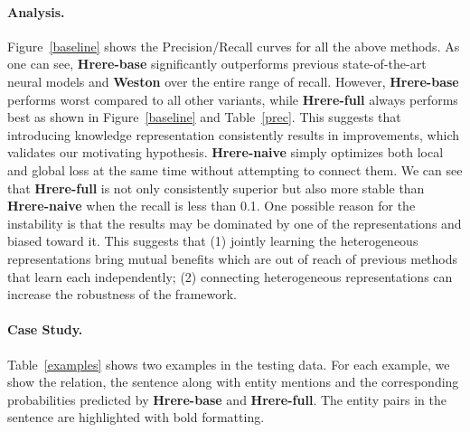 \documentclass[11pt,a4paper]{article}
\def\HRERE{{\sc Hrere}\xspace}
\begin{document}
\paragraph*{Analysis.}
Figure~\ref{baseline} shows the Precision/Recall curves for all the above methods.
As one can see, {\bf \HRERE-base} significantly outperforms previous state-of-the-art neural models and {\bf Weston} over the entire range of recall.
However, {\bf \HRERE-base} performs worst compared to all other variants, while {\bf \HRERE-full} always performs best as shown in Figure~\ref{baseline} and Table~\ref{prec}.
This suggests that introducing knowledge representation consistently results in improvements, which validates our motivating hypothesis.
{\bf \HRERE-naive} simply optimizes both local and global loss at the same time without attempting to connect them.
We can see that {\bf \HRERE-full} is not only consistently superior but also more stable than {\bf \HRERE-naive} when the recall is less than 0.1.
One possible reason for the instability is that the results may be dominated by one of the representations and biased toward it.
This suggests that (1) jointly learning the heterogeneous representations bring mutual benefits which are out of reach of previous methods that learn each independently; (2) connecting heterogeneous representations can increase the robustness of the framework.










\paragraph*{Case Study.}





 Table~\ref{examples} shows two examples in the testing data.
 For each example, we show the relation, the sentence along with entity mentions and the corresponding probabilities predicted by {\bf \HRERE-base} and {\bf \HRERE-full}. 
 The entity pairs in the sentence are highlighted with bold formatting.
\end{document}
